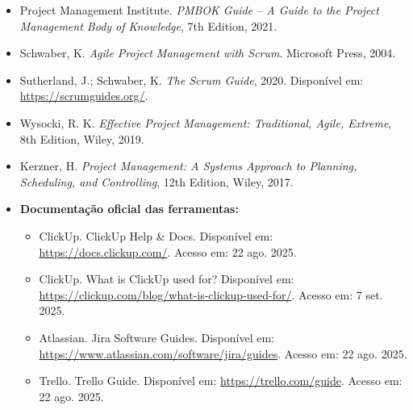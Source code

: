 \documentclass[12pt]{article}
\begin{document}
\begin{itemize}
    \item Project Management Institute. \textit{PMBOK Guide – A Guide to the Project Management Body of Knowledge}, 7th Edition, 2021.
    \item Schwaber, K. \textit{Agile Project Management with Scrum}. Microsoft Press, 2004.
    \item Sutherland, J.; Schwaber, K. \textit{The Scrum Guide}, 2020. Disponível em: \url{https://scrumguides.org/}.
    \item Wysocki, R. K. \textit{Effective Project Management: Traditional, Agile, Extreme}, 8th Edition, Wiley, 2019.
    \item Kerzner, H. \textit{Project Management: A Systems Approach to Planning, Scheduling, and Controlling}, 12th Edition, Wiley, 2017.

    \item \textbf{Documentação oficial das ferramentas:}
    \begin{itemize}
        \item ClickUp. ClickUp Help \& Docs. Disponível em: \url{https://docs.clickup.com/}. Acesso em: 22 ago. 2025.
        \item ClickUp. What is ClickUp used for? Disponível em: \url{https://clickup.com/blog/what-is-clickup-used-for/}. Acesso em: 7 set. 2025.
        \item Atlassian. Jira Software Guides. Disponível em: \url{https://www.atlassian.com/software/jira/guides}. Acesso em: 22 ago. 2025.
        \item Trello. Trello Guide. Disponível em: \url{https://trello.com/guide}. Acesso em: 22 ago. 2025.
    \end{itemize}
\end{itemize}
\end{document}
